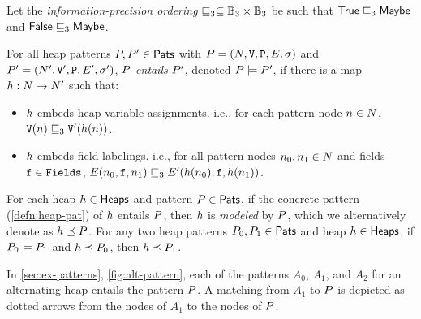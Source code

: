 
\begin{defn}
  \label{defn:match}
  Let the \emph{information-precision ordering} $\sqsubseteq_3 \subseteq
  \mathbb{B}_3 \times \mathbb{B}_3$ be such that $\mathsf{True} \sqsubseteq_3 \mathsf{Maybe}$
  and $\mathsf{False} \sqsubseteq_3 \mathsf{Maybe}$.

  For all heap patterns $P, P' \in \mathsf{Pats}$ with $P =
  (N, \mathtt{V}, \mathtt{P}, E, \sigma)$ and $P' = (N',
  \mathtt{V}', \mathtt{P}, E', \sigma')$, $P$ \emph{entails} $P'$, denoted
  $P \models P'$, if there is a map $h: N
  \to N'$ such that:
  \begin{itemize}
  \item
    $h$ embeds heap-variable assignments.
    i.e., for each pattern node $n \in N$,
    $\mathtt{V}(n) \sqsubseteq_3 \mathtt{V}'(h(n))$.
  \item
    $h$ embeds field labelings.
    i.e., for all pattern nodes $n_0, n_1 \in N$
    and fields $\mathtt{f} \in \mathtt{Fields}$, $E(n_0, \mathtt{f},
    n_1) \sqsubseteq_3 E'(h(n_0), \mathtt{f},
    h(n_1))$.
  \end{itemize}
\end{defn}
For each heap $h \in \mathsf{Heaps}$ and pattern $P \in \mathsf{Pats}$,
if the concrete pattern (\autoref{defn:heap-pat}) of $h$ entails
$P$, then $h$ is \emph{modeled} by $P$, which we
alternatively denote as $h \preceq P$.
%
For any two heap patterns $P_0, P_1 \in \mathsf{Pats}$ and heap
$h \in \mathsf{Heaps}$, if $P_0 \models P_1$ and $h
\preceq P_0$, then $h \preceq P_1$.
%
\begin{ex}
  \label{ex:pat-entails}
  In \autoref{sec:ex-patterns}, \autoref{fig:alt-pattern}, each of the
  patterns $A_0$, $A_1$, and $A_2$ for an alternating heap entails the
  pattern $P$.
  A matching from $A_1$ to $P$ is depicted as dotted arrows from
  the nodes of $A_1$ to the nodes of $P$.
\end{ex}


